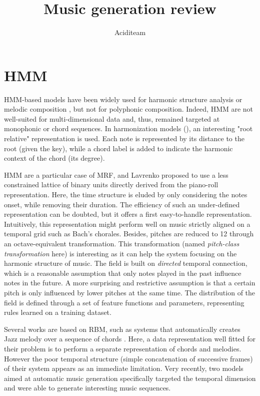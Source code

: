 \documentclass{report}
\title{Music generation review}
\author{Aciditeam}
\begin{document}
\maketitle

\section{HMM}
HMM-based models have been widely used for harmonic structure analysis \cite{allan2005harmonising,pickens2003polyphonic,pachet2001musical} or melodic composition \cite{Yamanishi:2010aa}, but not for polyphonic composition. Indeed, HMM are not well-suited for multi-dimensional data and, thus, remained targeted at monophonic or chord sequences. In harmonization models (\cite{allan2005harmonising}), an interesting "root relative" representation is used. Each note is represented by its distance to the root (given the key), while a chord label is added to indicate the harmonic context of the chord (its degree).

\gls*{HMM} are a particular case of \gls*{MRF}, and Lavrenko proposed to use a less constrained lattice of binary units directly derived from the piano-roll representation\cite{lavrenko2003polyphonic}. Here, the time structure is eluded by only considering the notes onset, while removing their duration. The efficiency of such an under-defined representation can be doubted, but it offers a first easy-to-handle representation. Intuitively, this representation might perform well on music strictly aligned on a temporal grid such as Bach's chorales. Besides, pitches are reduced to 12 through an octave-equivalent transformation. This transformation (named \textit{pitch-class transformation} here) is interesting as it can help the system focusing on the harmonic structure of music.
The field is built on \textit{directed} temporal connection, which is a reasonable assumption that only notes played in the past influence notes in the future. A more surprising and restrictive assumption is that a certain pitch is only influenced by lower pitches at the same time. The distribution of the field is defined through a set of feature functions and parameters, representing rules learned on a training dataset.

Several works are based on \gls*{RBM}, such as systems that automatically creates Jazz melody over a sequence of chords \cite{bickerman2010learning}. Here, a data representation well fitted for their problem is to perform a separate representation of chords and melodies. However the poor temporal structure (simple concatenation of successive frames) of their system appears as an immediate limitation. Very recently, two models aimed at automatic music generation specifically targeted the temporal dimension and were able to generate interesting music sequences.
\end{document}
